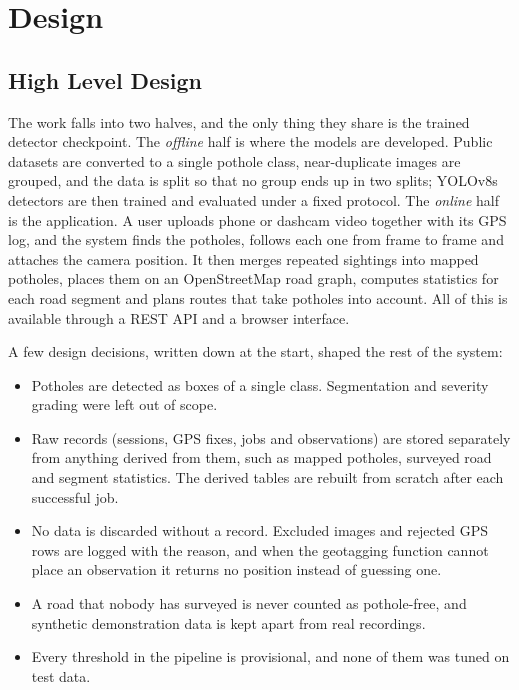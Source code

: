 \chapter{Design}\label{ch:design}

\section{High Level Design}\label{sec:ch4-hld}

The work falls into two halves, and the only thing they share is the trained detector checkpoint. The \emph{offline} half is where the models are developed. Public datasets are converted to a single pothole class, near-duplicate images are grouped, and the data is split so that no group ends up in two splits; YOLOv8s detectors are then trained and evaluated under a fixed protocol. The \emph{online} half is the application. A user uploads phone or dashcam video together with its GPS log, and the system finds the potholes, follows each one from frame to frame and attaches the camera position. It then merges repeated sightings into mapped potholes, places them on an OpenStreetMap road graph, computes statistics for each road segment and plans routes that take potholes into account. All of this is available through a REST API and a browser interface.

A few design decisions, written down at the start, shaped the rest of the system:
\begin{itemize}[itemsep=0pt]
\item Potholes are detected as boxes of a single class. Segmentation and severity grading were left out of scope.
\item Raw records (sessions, GPS fixes, jobs and observations) are stored separately from anything derived from them, such as mapped potholes, surveyed road and segment statistics. The derived tables are rebuilt from scratch after each successful job.
\item No data is discarded without a record. Excluded images and rejected GPS rows are logged with the reason, and when the geotagging function cannot place an observation it returns no position instead of guessing one.
\item A road that nobody has surveyed is never counted as pothole-free, and synthetic demonstration data is kept apart from real recordings.
\item Every threshold in the pipeline is provisional, and none of them was tuned on test data.
\end{itemize}

